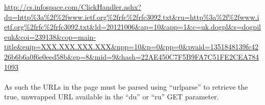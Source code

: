 \url{http://cs.infospace.com/ClickHandler.ashx?du=http%
}

\paragraph{}
As such the URLs in the page must be parsed using ``urlparse'' to retrieve the true, unwrapped URL available in the ``du'' or ``ru'' GET parameter\cite{rfc3092}.